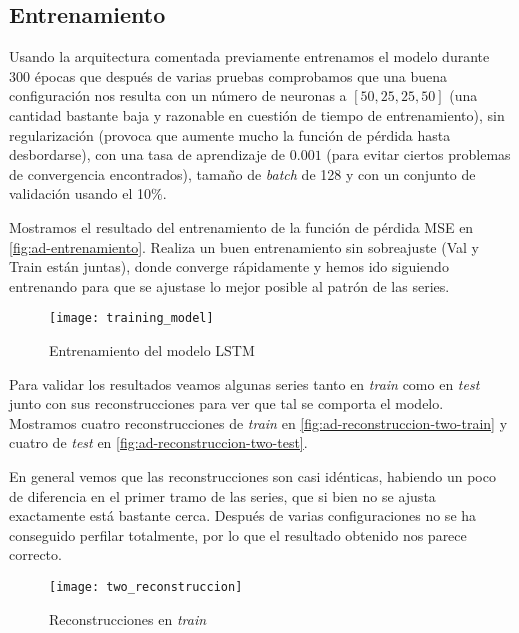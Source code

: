 \subsection{Entrenamiento}

Usando la arquitectura comentada previamente entrenamos el modelo durante 300 épocas que después de varias pruebas comprobamos que una buena configuración nos resulta con un número de neuronas a $[50, 25, 25, 50]$ (una cantidad bastante baja y razonable en cuestión de tiempo de entrenamiento), sin regularización (provoca que aumente mucho la función de pérdida hasta desbordarse), con una tasa de aprendizaje de $0.001$ (para evitar ciertos problemas de convergencia encontrados), tamaño de \emph{batch} de 128 y con un conjunto de validación usando el 10\%.

Mostramos el resultado del entrenamiento de la función de pérdida MSE en \autoref{fig:ad-entrenamiento}. Realiza un buen entrenamiento sin sobreajuste (Val y Train están juntas), donde converge rápidamente y hemos ido siguiendo entrenando para que se ajustase lo mejor posible al patrón de las series.

\begin{figure}[htpb]
  \centering
  \texttt{[image: training\_model]}
  \caption{Entrenamiento del modelo LSTM}
  \label{fig:ad-entrenamiento}
\end{figure}

Para validar los resultados veamos algunas series tanto en \emph{train} como en \emph{test} junto con sus reconstrucciones para ver que tal se comporta el modelo.
Mostramos cuatro reconstrucciones de \emph{train} en \autoref{fig:ad-reconstruccion-two-train} y cuatro de \emph{test} en \autoref{fig:ad-reconstruccion-two-test}.

En general vemos que las reconstrucciones son casi idénticas, habiendo un poco de diferencia en el primer tramo de las series, que si bien no se ajusta exactamente está bastante cerca. Después de varias configuraciones no se ha conseguido perfilar totalmente, por lo que el resultado obtenido nos parece correcto.

\begin{figure}[htpb]
  \centering
  \texttt{[image: two\_reconstruccion]}
  \caption{Reconstrucciones en \emph{train}}
  \label{fig:ad-reconstruccion-two-train}
\end{figure}

